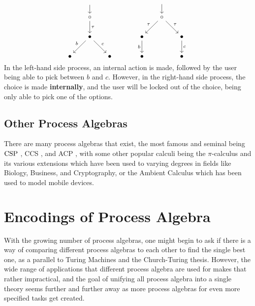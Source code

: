 \documentclass[../hons_project.tex]{subfiles}
\begin{document}
\begin{equation}
\begin{tikzcd}[cramped, column sep=scriptsize]
		& {} &&&& {} \\
		& \circ &&&& \circ \\
		& \bullet &&& \bullet && \bullet \\
		\bullet && \bullet && \bullet && \bullet
		\arrow[shorten <=5pt, from=1-2, to=2-2]
		\arrow[shorten <=4pt, from=1-6, to=2-6]
		\arrow["\tau", from=2-2, to=3-2]
		\arrow["\tau"', from=2-6, to=3-5]
		\arrow["\tau", from=2-6, to=3-7]
		\arrow["b"', from=3-2, to=4-1]
		\arrow["c", from=3-2, to=4-3]
		\arrow["b"', from=3-5, to=4-5]
		\arrow["c", from=3-7, to=4-7]
	\end{tikzcd}
\end{equation}
In the left-hand side process, an internal action is made, followed by the user being able to pick between $b$ and $c$. However, in the right-hand side process, the choice is made \textbf{internally}, and the user will be locked out of the choice, being only able to pick one of the options.

\subsection{Other Process Algebras}
There are many process algebras that exist, the most famous and seminal being $\mathrm{CSP}$ \citep{brookesTheoryCommunicatingSequential1984}, CCS \citep{milnerCalculusCommunicatingSystems1980}, and ACP \citep{bergstraProcessAlgebraSynchronous1984, bergstraACPtUniversalAxiom1989}, with some other popular calculi being the $\pi$-calculus and its various extensions  \citep{MILNER19921, parrowFusionCalculusExpressiveness1998, abadiCalculusCryptographicProtocols1999} which have been used to varying degrees in fields like Biology, Business, and Cryptography, or the Ambient Calculus \citep{cardelliMobileAmbients1998} which has been used to model mobile devices.

\section{Encodings of Process Algebra}

With the growing number of process algebras, one might begin to ask if there is a way of comparing different process algebras to each other to find the single best one, as a parallel to Turing Machines and the Church-Turing thesis. However, the wide range of applications that different process algebra are used for makes that rather impractical, and the goal of unifying all process algebra into a single theory seems further and further away as more process algebras for even more specified tasks get created.
\end{document}

